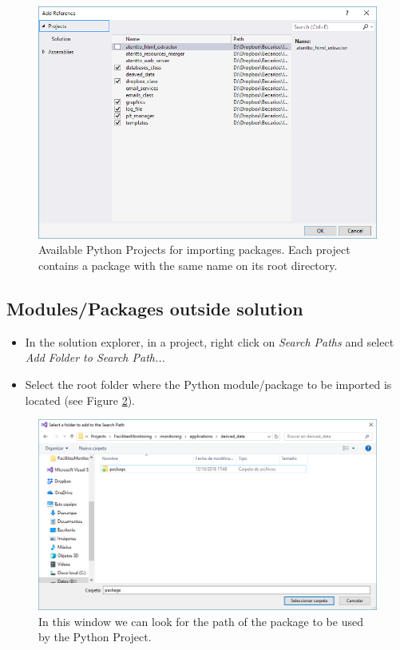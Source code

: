 \begin{figure}[h]
    \centering
    \includegraphics[width= \textwidth]{Figures/PPR0.png}
    \caption{Available Python Projects for importing packages. Each project contains a package with the same name on its root directory.}
    \label{fig:refs0}
\end{figure}

\subsection*{Modules/Packages outside solution}

\begin{itemize}
	\item In the solution explorer, in a project, right click on \textit{Search Paths} and select \textit{Add Folder to Search Path...}
	\item Select the root folder where the Python module/package to be imported is located (see Figure \ref{fig:refs1}).
\end{itemize}

\begin{figure}[h]
    \centering
    \includegraphics[width=\textwidth]{Figures/PPR1.png}
    \caption{In this window we can look for the path of the package to be used by the Python Project.}
    \label{fig:refs1}
\end{figure}

